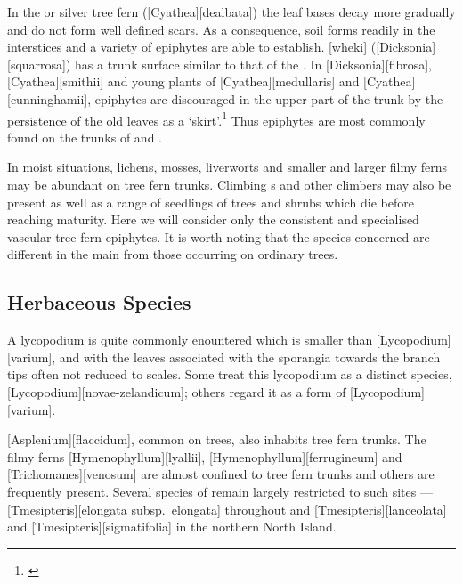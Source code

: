 In the  or silver tree fern ([Cyathea][dealbata]) the leaf bases decay more gradually and do not form well defined scars.
As a consequence, soil forms readily in the interstices and a variety of epiphytes are able to establish.
[wheki] ([Dicksonia][squarrosa]) has a trunk surface similar to that of the .
In [Dicksonia][fibrosa], [Cyathea][smithii] and young plants of [Cyathea][medullaris] and [Cyathea][cunninghamii],  epiphytes are discouraged in the upper part of the trunk by the persistence of the old leaves as a `skirt'.\footnote{\cite{page1986tree}}
Thus epiphytes are most commonly found on the trunks of  and .

In moist situations, lichens, mosses, liverworts and smaller and larger filmy ferns may be abundant on tree fern trunks.
Climbing s and other climbers may also be present as well as a range of seedlings of trees and shrubs which die before reaching maturity.
Here we will consider only the consistent and specialised vascular tree fern epiphytes.
It is worth noting that the species concerned are different in the main from those occurring on ordinary trees.

\subsection{Herbaceous Species}

A lycopodium is quite commonly enountered which is smaller than [Lycopodium][varium], and with the leaves associated with the sporangia towards the branch tips often not reduced to scales.
Some treat this lycopodium as a distinct species, [Lycopodium][novae-zelandicum]; others regard it as a form of [Lycopodium][varium].

[Asplenium][flaccidum], common on trees, also inhabits tree fern trunks.
The filmy ferns [Hymenophyllum][lyallii], [Hymenophyllum][ferrugineum] and [Trichomanes][venosum] are almost confined to tree fern trunks and others are frequently present.
Several species of  remain largely restricted to such sites --- [Tmesipteris][elongata subsp.\ elongata] throughout and [Tmesipteris][lanceolata] and [Tmesipteris][sigmatifolia] in the northern North Island.

